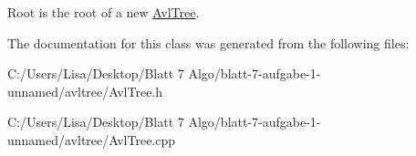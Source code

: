 Root is the root of a new \mbox{\hyperlink{class_avl_tree}{Avl\+Tree}}. 

The documentation for this class was generated from the following files\+:\begin{DoxyCompactItemize}
\item 
C\+:/\+Users/\+Lisa/\+Desktop/\+Blatt 7 Algo/blatt-\/7-\/aufgabe-\/1-\/unnamed/avltree/Avl\+Tree.\+h\item 
C\+:/\+Users/\+Lisa/\+Desktop/\+Blatt 7 Algo/blatt-\/7-\/aufgabe-\/1-\/unnamed/avltree/Avl\+Tree.\+cpp\end{DoxyCompactItemize}
